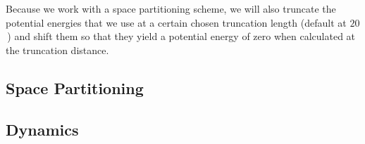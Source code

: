 Because we work with a space partitioning scheme, we will also truncate the potential energies that we use at a certain chosen truncation length (default at $20$\,\Angstrom) and shift them so that they yield a potential energy of zero when calculated at the truncation distance.

\subsection{Space Partitioning}



\subsection{Dynamics}
